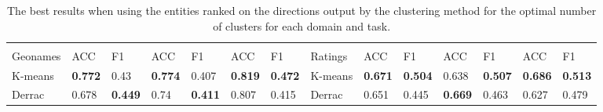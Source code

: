 {\begin{landscape}
\begin{table}[]
\begin{tabular}{llllllllllllll}
&                                 &                                 &                                 &                                 &                                 &                                 &                                &                                 &                                 &                                 &                                 &                                 &                            \\
Geonames    & ACC                             & F1                              & ACC                             & F1                              & ACC                             & F1                              & Ratings                        & ACC                             & F1                              & ACC                             & F1                              & ACC                             & F1                       \\
\toprule[\heavyrulewidth]
K-means     & \textbf{0.772} & 0.43                            & \textbf{0.774} & 0.407                           & \textbf{0.819} & \textbf{0.472} & K-means                        & \textbf{0.671} & \textbf{0.504} & 0.638                           & \textbf{0.507} & \textbf{0.686} & \textbf{0.513}       \\

Derrac      & 0.678                           & \textbf{0.449} & 0.74                            & \textbf{0.411} & 0.807                           & 0.415                           & Derrac                         & 0.651                           & 0.445                           & \textbf{0.669} & 0.463                           & 0.627                           & 0.479                 
	\end{tabular}
\centering
\caption{The best results when using the entities ranked on the directions output by the clustering method for the optimal number of clusters for each domain and task.}
\end{table}
\end{landscape}
}


